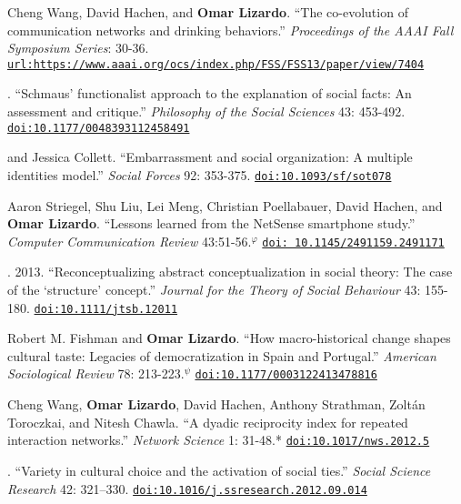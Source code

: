 
\ind Cheng Wang, David Hachen, and {\bf Omar Lizardo}. ``The co-evolution of communication networks and drinking behaviors.''  {\em Proceedings of the AAAI Fall Symposium Series}: 30-36. \href{https://www.aaai.org/ocs/index.php/FSS/FSS13/paper/view/7404}{\nolinkurl{url:https://www.aaai.org/ocs/index.php/FSS/FSS13/paper/view/7404}}

.  ``Schmaus' functionalist approach to the explanation of social facts: An assessment and critique.''  {\em Philosophy of the Social Sciences} 43: 453-492. \href{https://doi.org/10.1177/0048393112458491}{\nolinkurl{doi:10.1177/0048393112458491}} 

 and Jessica Collett. ``Embarrassment and social organization: A multiple identities model.'' {\em Social Forces} 92: 353-375.  \href{https://doi.org/10.1093/sf/sot078}{\nolinkurl{doi:10.1093/sf/sot078}}

\ind Aaron Striegel, Shu Liu, Lei Meng, Christian Poellabauer, David Hachen, and {\bf Omar Lizardo}. ``Lessons learned from the NetSense smartphone study.'' {\em Computer Communication Review} 43:51-56.\textcolor{black}{$^{\varphi}$}  \href{https://doi.org/ 10.1145/2491159.2491171}{\nolinkurl{doi: 10.1145/2491159.2491171}}

. 2013. ``Reconceptualizing abstract conceptualization in social theory: The case of the ‘structure’ concept.'' {\em Journal for the Theory of Social Behaviour} 43: 155-180. \href{https://doi.org/10.1111/jtsb.12011}{\nolinkurl{doi:10.1111/jtsb.12011}} 

\ind Robert M. Fishman and {\bf Omar Lizardo}. ``How macro-historical change shapes cultural taste: Legacies of democratization in Spain and Portugal.'' {\em American Sociological Review} 78: 213-223.\textcolor{black}{$^{\psi}$} \href{https://doi.org/10.1177/0003122413478816}{\nolinkurl{doi:10.1177/0003122413478816}}

\ind Cheng Wang, {\bf Omar Lizardo}, David Hachen, Anthony Strathman, Zolt\'{a}n Toroczkai, and Nitesh Chawla. ``A dyadic reciprocity index for repeated interaction networks.'' {\em Network Science} 1: 31-48.\textcolor{uclablue}{*} \href{https://doi.org/10.1017/nws.2012.5}{\nolinkurl{doi:10.1017/nws.2012.5}}

. ``Variety in cultural choice and the activation of social ties.'' {\em Social Science Research} 42: 321–330. \href{https://doi.org/10.1016/j.ssresearch.2012.09.014
}{\nolinkurl{doi:10.1016/j.ssresearch.2012.09.014
}}